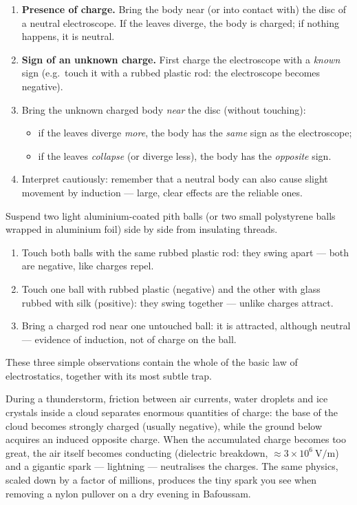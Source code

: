 \documentclass[11pt]{article}
\begin{document}
\begin{methode}
\begin{enumerate}
\item \textbf{Presence of charge.} Bring the body near (or into contact with) the disc of a neutral electroscope. If the leaves diverge, the body is charged; if nothing happens, it is neutral.
\item \textbf{Sign of an unknown charge.} First charge the electroscope with a \emph{known} sign (e.g.\ touch it with a rubbed plastic rod: the electroscope becomes negative).
\item Bring the unknown charged body \emph{near} the disc (without touching):
\begin{itemize}
\item if the leaves diverge \emph{more}, the body has the \emph{same} sign as the electroscope;
\item if the leaves \emph{collapse} (or diverge less), the body has the \emph{opposite} sign.
\end{itemize}
\item Interpret cautiously: remember that a neutral body can also cause slight movement by induction — large, clear effects are the reliable ones.
\end{enumerate}
\end{methode}

\begin{experience}
Suspend two light aluminium-coated pith balls (or two small polystyrene balls wrapped in aluminium foil) side by side from insulating threads.
\begin{enumerate}
\item Touch both balls with the same rubbed plastic rod: they swing apart — both are negative, like charges repel.
\item Touch one ball with rubbed plastic (negative) and the other with glass rubbed with silk (positive): they swing together — unlike charges attract.
\item Bring a charged rod near one untouched ball: it is attracted, although neutral — evidence of induction, not of charge on the ball.
\end{enumerate}
These three simple observations contain the whole of the basic law of electrostatics, together with its most subtle trap.
\end{experience}

\begin{savaistu}
During a thunderstorm, friction between air currents, water droplets and ice crystals inside a cloud separates enormous quantities of charge: the base of the cloud becomes strongly charged (usually negative), while the ground below acquires an induced opposite charge. When the accumulated charge becomes too great, the air itself becomes conducting (dielectric breakdown, $\approx 3\times 10^6\ \mathrm{V/m}$) and a gigantic spark — lightning — neutralises the charges. The same physics, scaled down by a factor of millions, produces the tiny spark you see when removing a nylon pullover on a dry evening in Bafoussam.
\end{savaistu}
\end{document}
